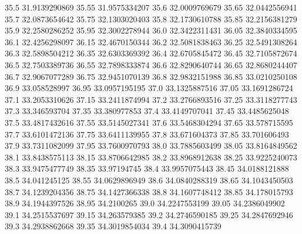            35.5    31.9139290869
          35.55    31.9575334207
           35.6    32.0009769679
          35.65    32.0442556941
           35.7    32.0873654642
          35.75    32.1303020403
           35.8    32.1730610788
          35.85    32.2156381279
           35.9    32.2580286252
          35.95    32.3002278944
           36.0    32.3422311431
          36.05    32.3840334595
           36.1    32.4256298097
          36.15    32.4670150344
           36.2    32.5081838463
          36.25    32.5491308264
           36.3    32.5898504212
          36.35    32.6303369392
           36.4    32.6705845472
          36.45    32.7105872674
           36.5    32.7503389736
          36.55    32.7898333874
           36.6    32.8290640744
          36.65    32.8680244407
           36.7    32.9067077289
          36.75    32.9451070139
           36.8    32.9832151988
          36.85    33.0210250108
           36.9     33.058528997
          36.95    33.0957195195
           37.0    33.1325887516
          37.05    33.1691286724
           37.1    33.2053310626
          37.15    33.2411874994
           37.2    33.2766893516
          37.25    33.3118277743
           37.3     33.346593704
          37.35     33.380977853
           37.4    33.4149707041
          37.45    33.4485625048
           37.5    33.4817432616
          37.55    33.5145027341
           37.6    33.5468304294
          37.65     33.578715595
           37.7    33.6101472136
          37.75    33.6411139955
           37.8     33.671604373
          37.85     33.701606493
           37.9    33.7311082099
          37.95    33.7600970793
           38.0    33.7885603499
          38.05    33.8164849562
           38.1    33.8438575113
          38.15    33.8706642985
           38.2    33.8968912638
          38.25    33.9225240073
           38.3    33.9475477749
          38.35      33.97194745
           38.4    33.9957075443
          38.45    34.0188121888
           38.5     34.041245125
          38.55    34.0629896949
           38.6    34.0840288319
          38.65    34.1043450503
           38.7    34.1239204356
          38.75    34.1427366338
           38.8    34.1607748412
          38.85     34.178015793
           38.9    34.1944397526
          38.95       34.2100265
           39.0    34.2247553199
          39.05    34.2386049902
           39.1    34.2515537697
          39.15     34.263579385
           39.2    34.2746590185
          39.25    34.2847692946
           39.3    34.2938862668
          39.35    34.3019854034
           39.4    34.3090415739
